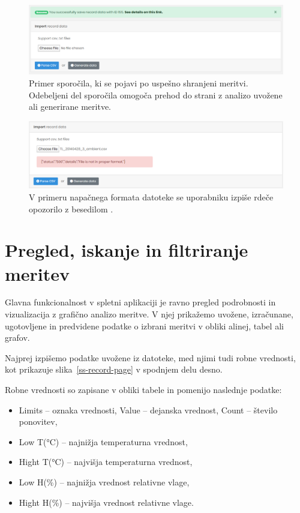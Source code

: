 \documentclass[a4paper, 12pt]{book}
\begin{document}
\begin{figure}[h]
\begin{center}
\includegraphics[width=\textwidth]{slike/import_success.png}
\end{center}
\caption{Primer sporočila, ki se pojavi po uspešno shranjeni meritvi. Odebeljeni del sporočila omogoča prehod do strani z analizo uvožene ali generirane meritve.}
\label{ss-import-success}
\end{figure}

\begin{figure}[h]
\begin{center}
\includegraphics[width=\textwidth]{slike/import_error.png}
\end{center}
\caption{V primeru napačnega formata datoteke se uporabniku izpiše rdeče opozorilo z besedilom .}
\label{ss-import-error}
\end{figure}


\section{Pregled, iskanje in filtriranje meritev}

Glavna funkcionalnost v spletni aplikaciji je ravno pregled podrobnosti in vizualizacija z grafično analizo meritve. V njej prikažemo uvožene, izračunane, ugotovljene in predvidene podatke o izbrani meritvi v obliki alinej, tabel ali grafov. 

Najprej izpišemo podatke uvožene iz datoteke, med njimi tudi robne vrednosti, kot prikazuje slika~\ref{ss-record-page} v spodnjem delu desno.

Robne vrednosti so zapisane v obliki tabele in pomenijo naslednje podatke:
\begin{itemize}
	\item Limits – oznaka vrednosti, Value – dejanska vrednost, Count – število ponovitev,
	\item Low T(°C) – najnižja temperaturna vrednost,
	\item Hight T(°C) – najvišja temperaturna vrednost,
	\item Low H(\%) – najnižja vrednost relativne vlage,
	\item Hight H(\%) – najvišja vrednost relativne vlage.
\end{itemize}
\end{document}
